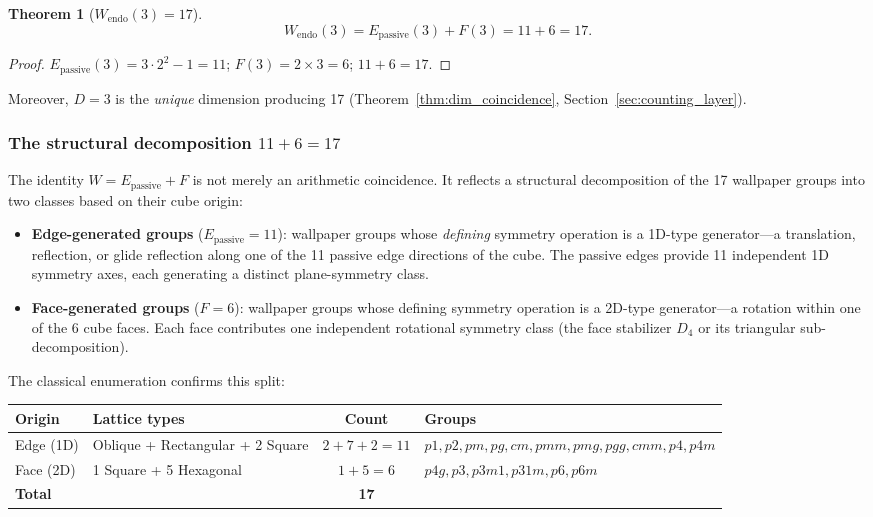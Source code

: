 \documentclass[11pt,a4paper]{article}
\newtheorem{theorem}{Theorem}[section]
\theoremstyle{definition}
\theoremstyle{remark}
\newcommand{\Epass}{E_{\mathrm{passive}}}
\begin{document}
\begin{theorem}[$W_{\mathrm{endo}}(3) = 17$]
\label{thm:W_17}
\begin{equation}
  W_{\mathrm{endo}}(3) = \Epass(3) + F(3) = 11 + 6 = 17.
  \label{eq:W_17}
\end{equation}
\end{theorem}

\begin{proof}
$\Epass(3) = 3 \cdot 2^2 - 1 = 11$;\; $F(3) = 2 \times 3 = 6$;\;
$11 + 6 = 17$.
\end{proof}

\noindent
Moreover, $D = 3$ is the \emph{unique} dimension producing 17
(Theorem~\ref{thm:dim_coincidence}, Section~\ref{sec:counting_layer}).

\subsubsection{The structural decomposition $11 + 6 = 17$}

The identity $W = \Epass + F$ is not merely an arithmetic coincidence.
It reflects a structural decomposition of the 17 wallpaper groups into
two classes based on their cube origin:

\begin{itemize}[nosep]
  \item \textbf{Edge-generated groups} ($\Epass = 11$): wallpaper groups
    whose \emph{defining} symmetry operation is a 1D-type generator---a
    translation, reflection, or glide reflection along one of the 11 passive
    edge directions of the cube.  The passive edges provide 11 independent
    1D symmetry axes, each generating a distinct plane-symmetry class.

  \item \textbf{Face-generated groups} ($F = 6$): wallpaper groups whose
    defining symmetry operation is a 2D-type generator---a rotation within
    one of the 6 cube faces.  Each face contributes one independent rotational
    symmetry class (the face stabilizer $D_4$ or its triangular sub-decomposition).
\end{itemize}

\noindent
The classical enumeration confirms this split:

\begin{center}
\small
\begin{tabular}{llcp{5.5cm}}
\toprule
Origin & Lattice types & Count & Groups \\
\midrule
Edge (1D) & Oblique + Rectangular + 2 Square &
  $2 + 7 + 2 = 11$ & $p1, p2, pm, pg, cm, pmm, pmg, pgg, cmm, p4, p4m$ \\
Face (2D) & 1 Square + 5 Hexagonal &
  $1 + 5 = 6$ & $p4g, p3, p3m1, p31m, p6, p6m$ \\
\midrule
\textbf{Total} & & \textbf{17} & \\
\bottomrule
\end{tabular}
\end{center}
\end{document}
